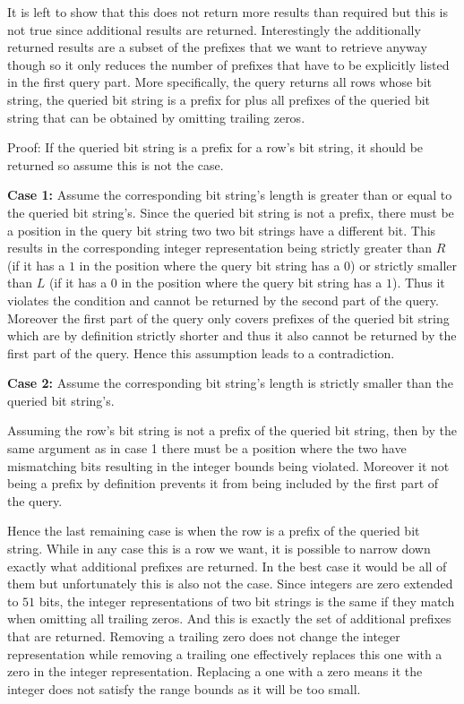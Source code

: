 \documentclass[10pt,conference,compsocconf]{IEEEtran}
\begin{document}
It is left to show that this does not return more results than required but this is not true since additional results are returned.
Interestingly the additionally returned results are a subset of the prefixes that we want to retrieve anyway though so it only reduces the number of prefixes that have to be explicitly listed in the first query part.
More specifically, the query returns all rows whose bit string, the queried bit string is a prefix for plus all prefixes of the queried bit string that can be obtained by omitting trailing zeros.

Proof:
If the queried bit string is a prefix for a row's bit string, it should be returned so assume this is not the case.

\textbf{Case 1:} Assume the corresponding bit string's length is greater than or equal to the queried bit string's.
Since the queried bit string is not a prefix, there must be a position in the query bit string two two bit strings have a different bit.
This results in the corresponding integer representation being strictly greater than $R$ (if it has a $1$ in the position where the query bit string has a $0$) or strictly smaller than $L$ (if it has a $0$ in the position where the query bit string has a $1$).
Thus it violates the condition and cannot be returned by the second part of the query.
Moreover the first part of the query only covers prefixes of the queried bit string which are by definition strictly shorter and thus it also cannot be returned by the first part of the query.
Hence this assumption leads to a contradiction.

\textbf{Case 2:} Assume the corresponding bit string's length is strictly smaller than the queried bit string's.

Assuming the row's bit string is not a prefix of the queried bit string, then by the same argument as in case 1 there must be a position where the two have mismatching bits resulting in the integer bounds being violated.
Moreover it not being a prefix by definition prevents it from being included by the first part of the query.

Hence the last remaining case is when the row is a prefix of the queried bit string.
While in any case this is a row we want, it is possible to narrow down exactly what additional prefixes are returned.
In the best case it would be all of them but unfortunately this is also not the case.
Since integers are zero extended to $51$ bits, the integer representations of two bit strings is the same if they match when omitting all trailing zeros.
And this is exactly the set of additional prefixes that are returned.
Removing a trailing zero does not change the integer representation while removing a trailing one effectively replaces this one with a zero in the integer representation.
Replacing a one with a zero means it the integer does not satisfy the range bounds as it will be too small.
\end{document}
